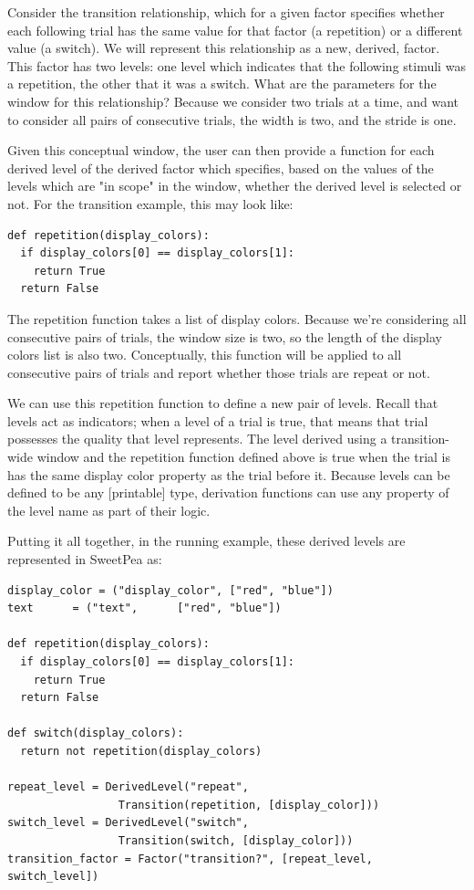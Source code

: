 Consider the transition relationship, which for a given factor specifies whether each following trial has the same value for that factor (a repetition) or a different value (a switch). We will represent this relationship as a new, derived, factor. This factor has two levels: one level which indicates that the following stimuli was a repetition, the other that it was a switch. What are the parameters for the window for this relationship? Because we consider two trials at a time, and want to consider all pairs of consecutive trials, the width is two, and the stride is one.

Given this conceptual window, the user can then provide a function for each derived level of the derived factor which specifies, based on the values of the levels which are "in scope" in the window, whether the derived level is selected or not. For the transition example, this may look like:

\begin{verbatim}
def repetition(display_colors):
  if display_colors[0] == display_colors[1]:
    return True
  return False
\end{verbatim}

The repetition function takes a list of display colors. Because we're considering all consecutive pairs of trials, the window size is two, so the length of the display colors list is also two. Conceptually, this function will be applied to all consecutive pairs of trials and report whether those trials are repeat or not.

We can use this repetition function to define a new pair of levels. Recall that levels act as indicators; when a level of a trial is true, that means that trial possesses the quality that level represents. The level derived using a transition-wide window and the repetition function defined above is true when the trial is has the same display color property as the trial before it. Because levels can be defined to be any [printable] type, derivation functions can use any property of the level name as part of their logic.

Putting it all together, in the running example, these derived levels are represented in SweetPea as:

\begin{verbatim}
display_color = ("display_color", ["red", "blue"])
text      = ("text",      ["red", "blue"])

def repetition(display_colors):
  if display_colors[0] == display_colors[1]:
    return True
  return False

def switch(display_colors):
  return not repetition(display_colors)

repeat_level = DerivedLevel("repeat",
                 Transition(repetition, [display_color]))
switch_level = DerivedLevel("switch",
                 Transition(switch, [display_color]))
transition_factor = Factor("transition?", [repeat_level, switch_level])

\end{verbatim}


